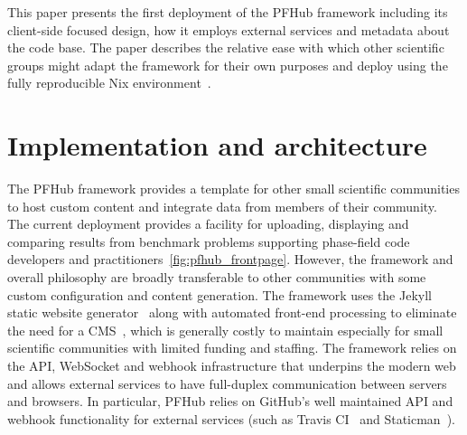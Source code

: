 \documentclass{jors}
\begin{document}
This paper presents the first deployment of the PFHub framework
including its client-side focused design, how it employs external
services and metadata about the code base. The paper describes the
relative ease with which other scientific groups might adapt the
framework for their own purposes and deploy using the fully
reproducible Nix environment~\cite{nix}.

\section*{Implementation and architecture}

The PFHub framework provides a template for other small scientific
communities to host custom content and integrate data from members of
their community. The current deployment provides a facility for
uploading, displaying and comparing results from benchmark problems
supporting phase-field code developers and
practitioners~\ref{fig:pfhub_frontpage}. However, the framework and
overall philosophy are broadly transferable to other communities with
some custom configuration and content generation. The framework uses
the Jekyll static website generator~\cite{jekyll} along with automated
front-end processing to eliminate the need for a CMS~\cite{cmsfree},
which is generally costly to maintain especially for small scientific
communities with limited funding and staffing.  The framework relies
on the API, WebSocket and webhook infrastructure that underpins the
modern web and allows external services to have full-duplex
communication between servers and browsers. In particular, PFHub
relies on GitHub's well maintained API and webhook functionality for
external services (such as Travis CI~\cite{travis} and
Staticman~\cite{staticman}).
\end{document}
